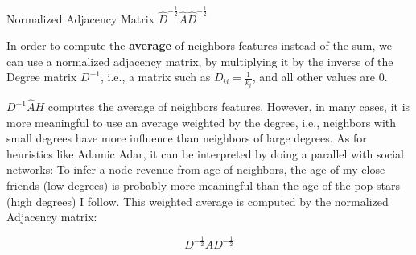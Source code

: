 \documentclass[a4paper,11pt]{book}
\begin{document}
\begin{textbox}{Normalized Adjacency Matrix $\hat{D}^{-\frac{1}{2}}\hat{A}\hat{D}^{-\frac{1}{2}}$}

In order to compute the \textbf{average} of neighbors features instead of the sum, we can use a normalized adjacency matrix, by multiplying it by the inverse of the Degree matrix $D^{-1}$, i.e., a matrix such as $D_{ii}=\frac{1}{k_i}$, and all other values are 0. 

$D^{-1}\hat{A}H$ computes the average of neighbors features. However, in many cases, it is more meaningful to use an average weighted by the degree, i.e., neighbors with small degrees have more influence than neighbors of large degrees. As for heuristics like Adamic Adar, it can be interpreted by doing a parallel with social networks: To infer a node revenue from age of neighbors, the age of my close friends (low degrees) is probably more meaningful than the age of the pop-stars (high degrees) I follow. This weighted average is computed by the normalized Adjacency matrix: 

\[
D^{-\frac{1}{2}}\hat{A}D^{-\frac{1}{2}}
\]

\end{textbox}
\end{document}
